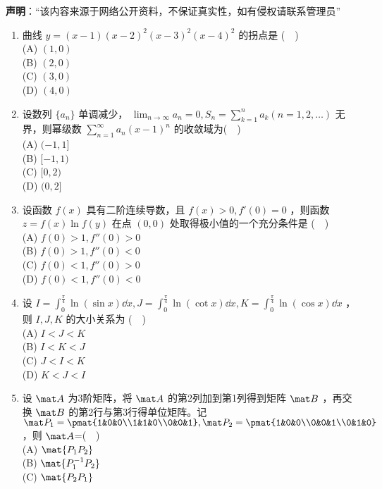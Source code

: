 
\textbf{声明}：“该内容来源于网络公开资料，不保证真实性，如有侵权请联系管理员”

\begin{enumerate}
\item 曲线 $y=(x-1)(x-2)^2(x-3)^2(x-4)^2$ 的拐点是  ($\quad$)\\
(A) $(1,0)$\\
(B) $(2,0)$\\
(C) $(3,0)$\\
(D) $(4,0)$
\item 设数列 $\{a_n\}$ 单调减少， $\displaystyle \lim_{n\to\infty} a_n=0,S_n=\sum_{k=1}^{n}a_k(n=1,2,\dots)$  无界，则幂级数 $\displaystyle \sum_{n=1}^\infty a_n(x-1)^n$ 的收敛域为($\quad$)\\
(A) $(-1,1]$\\
(B) $[-1,1)$\\
(C) $[0,2)$\\
(D) $(0,2]$
\item  设函数 $f(x)$ 具有二阶连续导数，且 $f(x)>0,f'(0)=0$  ，则函数  $z=f(x)\ln f(y)$ 在点 $(0,0)$ 处取得极小值的一个充分条件是 ($\quad$)\\
(A) $f(0)>1,f''(0)>0$\\
(B) $f(0)>1,f''(0)<0$\\
(C) $f(0)<1,f''(0)>0$\\
(D) $f(0)<1,f''(0)<0$
\item 设 $\displaystyle I=\int_{0}^{\frac{\pi}{4}}\ln (\sin x)\dd{x},J=\int_{0}^{\frac{\pi}{4}}\ln (\cot x)\dd{x},K=\int_{0}^{\frac{\pi}{4}}\ln (\cos x)\dd{x}$ ，则 $I,J,K$ 的大小关系为 ($\quad$)\\
(A) $I<J<K$\\
(B) $I<K<J$\\
(C) $J<I<K$\\
(D) $K<J<I$
\item 设 $\mat A$ 为3阶矩阵，将 $\mat A$ 的第2列加到第1列得到矩阵 $\mat B$ ，再交换 $\mat B$ 的第2行与第3行得单位矩阵。记 $\mat P_1=\pmat{1&0&0\\1&1&0\\0&0&1},\mat P_2=\pmat{1&0&0\\0&0&1\\0&1&0}$ ，则 $\mat A$=($\quad$)\\
(A) $\mat {P_1P_2}$\\
(B) $\mat {P_1^{-1}P_2}$\\
(C) $\mat {P_2P_1}$\\

\end{enumerate}

